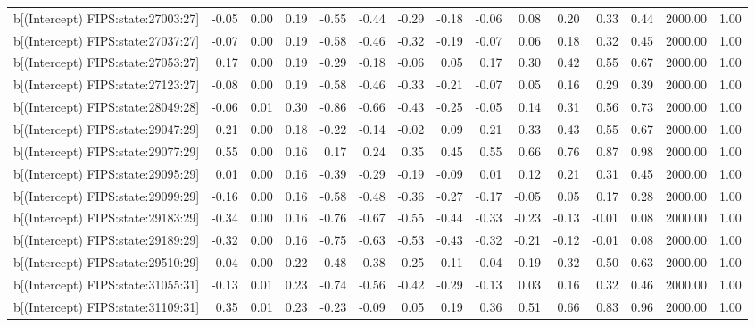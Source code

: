 \begin{table}[ht]
\begin{tabular}{rrrrrrrrrrrrrrr}
  b[(Intercept) FIPS:state:27003:27] & -0.05 & 0.00 & 0.19 & -0.55 & -0.44 & -0.29 & -0.18 & -0.06 & 0.08 & 0.20 & 0.33 & 0.44 & 2000.00 & 1.00 \\ 
  b[(Intercept) FIPS:state:27037:27] & -0.07 & 0.00 & 0.19 & -0.58 & -0.46 & -0.32 & -0.19 & -0.07 & 0.06 & 0.18 & 0.32 & 0.45 & 2000.00 & 1.00 \\ 
  b[(Intercept) FIPS:state:27053:27] & 0.17 & 0.00 & 0.19 & -0.29 & -0.18 & -0.06 & 0.05 & 0.17 & 0.30 & 0.42 & 0.55 & 0.67 & 2000.00 & 1.00 \\ 
  b[(Intercept) FIPS:state:27123:27] & -0.08 & 0.00 & 0.19 & -0.58 & -0.46 & -0.33 & -0.21 & -0.07 & 0.05 & 0.16 & 0.29 & 0.39 & 2000.00 & 1.00 \\ 
  b[(Intercept) FIPS:state:28049:28] & -0.06 & 0.01 & 0.30 & -0.86 & -0.66 & -0.43 & -0.25 & -0.05 & 0.14 & 0.31 & 0.56 & 0.73 & 2000.00 & 1.00 \\ 
  b[(Intercept) FIPS:state:29047:29] & 0.21 & 0.00 & 0.18 & -0.22 & -0.14 & -0.02 & 0.09 & 0.21 & 0.33 & 0.43 & 0.55 & 0.67 & 2000.00 & 1.00 \\ 
  b[(Intercept) FIPS:state:29077:29] & 0.55 & 0.00 & 0.16 & 0.17 & 0.24 & 0.35 & 0.45 & 0.55 & 0.66 & 0.76 & 0.87 & 0.98 & 2000.00 & 1.00 \\ 
  b[(Intercept) FIPS:state:29095:29] & 0.01 & 0.00 & 0.16 & -0.39 & -0.29 & -0.19 & -0.09 & 0.01 & 0.12 & 0.21 & 0.31 & 0.45 & 2000.00 & 1.00 \\ 
  b[(Intercept) FIPS:state:29099:29] & -0.16 & 0.00 & 0.16 & -0.58 & -0.48 & -0.36 & -0.27 & -0.17 & -0.05 & 0.05 & 0.17 & 0.28 & 2000.00 & 1.00 \\ 
  b[(Intercept) FIPS:state:29183:29] & -0.34 & 0.00 & 0.16 & -0.76 & -0.67 & -0.55 & -0.44 & -0.33 & -0.23 & -0.13 & -0.01 & 0.08 & 2000.00 & 1.00 \\ 
  b[(Intercept) FIPS:state:29189:29] & -0.32 & 0.00 & 0.16 & -0.75 & -0.63 & -0.53 & -0.43 & -0.32 & -0.21 & -0.12 & -0.01 & 0.08 & 2000.00 & 1.00 \\ 
  b[(Intercept) FIPS:state:29510:29] & 0.04 & 0.00 & 0.22 & -0.48 & -0.38 & -0.25 & -0.11 & 0.04 & 0.19 & 0.32 & 0.50 & 0.63 & 2000.00 & 1.00 \\ 
  b[(Intercept) FIPS:state:31055:31] & -0.13 & 0.01 & 0.23 & -0.74 & -0.56 & -0.42 & -0.29 & -0.13 & 0.03 & 0.16 & 0.32 & 0.46 & 2000.00 & 1.00 \\ 
  b[(Intercept) FIPS:state:31109:31] & 0.35 & 0.01 & 0.23 & -0.23 & -0.09 & 0.05 & 0.19 & 0.36 & 0.51 & 0.66 & 0.83 & 0.96 & 2000.00 & 1.00 \\ 

\end{tabular}
\end{table}
